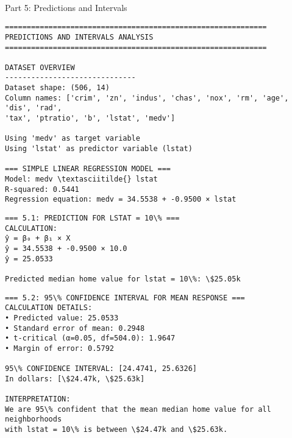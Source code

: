 \documentclass[11pt, twocolumn]{article}
\begin{document}
    \begin{center}
    \end{center}
    { \hspace*{\fill} \\}
    
    Part 5: Predictions and Intervals

    \begin{Verbatim}[commandchars=\\\{\}]
============================================================
PREDICTIONS AND INTERVALS ANALYSIS
============================================================

DATASET OVERVIEW
------------------------------
Dataset shape: (506, 14)
Column names: ['crim', 'zn', 'indus', 'chas', 'nox', 'rm', 'age', 'dis', 'rad',
'tax', 'ptratio', 'b', 'lstat', 'medv']

Using 'medv' as target variable
Using 'lstat' as predictor variable (lstat)

=== SIMPLE LINEAR REGRESSION MODEL ===
Model: medv \textasciitilde{} lstat
R-squared: 0.5441
Regression equation: medv = 34.5538 + -0.9500 × lstat

    \end{Verbatim}

    \begin{Verbatim}[commandchars=\\\{\}]
=== 5.1: PREDICTION FOR LSTAT = 10\% ===
CALCULATION:
ŷ = β₀ + β₁ × X
ŷ = 34.5538 + -0.9500 × 10.0
ŷ = 25.0533

Predicted median home value for lstat = 10\%: \$25.05k

    \end{Verbatim}

    \begin{Verbatim}[commandchars=\\\{\}]
=== 5.2: 95\% CONFIDENCE INTERVAL FOR MEAN RESPONSE ===
CALCULATION DETAILS:
• Predicted value: 25.0533
• Standard error of mean: 0.2948
• t-critical (α=0.05, df=504.0): 1.9647
• Margin of error: 0.5792

95\% CONFIDENCE INTERVAL: [24.4741, 25.6326]
In dollars: [\$24.47k, \$25.63k]

INTERPRETATION:
We are 95\% confident that the mean median home value for all neighborhoods
with lstat = 10\% is between \$24.47k and \$25.63k.

    \end{Verbatim}
\end{document}
